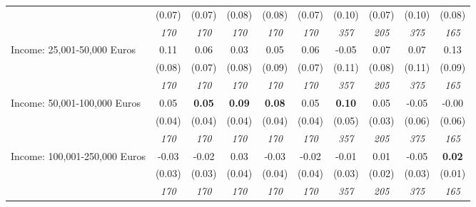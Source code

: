 \begin{tabular}{l c c c c c c c c c}
& (0.07) & (0.07) & (0.08) & (0.08) & (0.07) & (0.10) & (0.07) & (0.10) & (0.08) \\
& \textit{ 170 } & \textit{ 170 } & \textit{ 170 } & \textit{ 170 } & \textit{ 170 } & \textit{ 357 } & \textit{ 205 } & \textit{ 375 } & \textit{ 165 } \\
Income: 25,001-50,000 Euros & 0.11 & 0.06 & 0.03 & 0.05 & 0.06 & -0.05 & 0.07 & 0.07 & 0.13 \\
& (0.08) & (0.07) & (0.08) & (0.09) & (0.07) & (0.11) & (0.08) & (0.11) & (0.09) \\
& \textit{ 170 } & \textit{ 170 } & \textit{ 170 } & \textit{ 170 } & \textit{ 170 } & \textit{ 357 } & \textit{ 205 } & \textit{ 375 } & \textit{ 165 } \\
Income: 50,001-100,000 Euros & 0.05 & \textbf{ 0.05 } & \textbf{ 0.09 } & \textbf{0.08} & 0.05 & \textbf{ 0.10 } & 0.05 & -0.05 & -0.00 \\
& (0.04) & (0.04) & (0.04) & (0.04) & (0.04) & (0.05) & (0.03) & (0.06) & (0.06) \\
& \textit{ 170 } & \textit{ 170 } & \textit{ 170 } & \textit{ 170 } & \textit{ 170 } & \textit{ 357 } & \textit{ 205 } & \textit{ 375 } & \textit{ 165 } \\
Income: 100,001-250,000 Euros & -0.03 & -0.02 & 0.03 & -0.03 & -0.02 & -0.01 & 0.01 & -0.05 & \textbf{0.02} \\
& (0.03) & (0.03) & (0.04) & (0.04) & (0.04) & (0.03) & (0.02) & (0.03) & (0.01) \\
& \textit{ 170 } & \textit{ 170 } & \textit{ 170 } & \textit{ 170 } & \textit{ 170 } & \textit{ 357 } & \textit{ 205 } & \textit{ 375 } & \textit{ 165 } \\
\bottomrule
\end{tabular}
